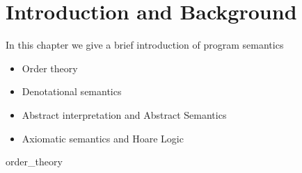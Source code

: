 \chapter{Introduction and Background}

In this chapter we give a brief introduction of program semantics

\begin{itemize}
  \item Order theory
  \item Denotational semantics
  \item Abstract interpretation and Abstract Semantics
  \item Axiomatic semantics and Hoare Logic
\end{itemize}


{order_theory}
